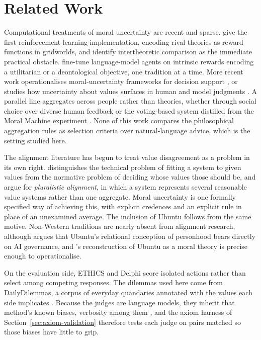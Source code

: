 \documentclass[10pt,twocolumn,a4paper]{article}
\begin{document}
\section{Related Work}
\label{sec:related}


Computational treatments of moral uncertainty are recent and sparse.
\citet{ecoffet2021} give the first reinforcement-learning
implementation, encoding rival theories as reward functions in
gridworlds, and identify intertheoretic comparison as the immediate
practical obstacle. \citet{tennant2024} fine-tune language-model agents
on intrinsic rewards encoding a utilitarian or a deontological
objective, one tradition at a time. More recent work operationalises
moral-uncertainty frameworks for decision support \cite{rosello2025},
or studies how uncertainty about values surfaces in human and model
judgments \cite{kwon2025}. A parallel line aggregates across people
rather than theories, whether through social choice over diverse human
feedback \cite{conitzer2024} or the voting-based system distilled from
the Moral Machine experiment \cite{awad2018,noothigattu2018}. None of
this work compares the philosophical aggregation rules as selection
criteria over natural-language advice, which is the setting studied
here.

The alignment literature has begun to treat value disagreement as a
problem in its own right. \citet{gabriel2020} distinguishes the
technical problem of fitting a system to given values from the
normative problem of deciding whose values those should be, and
\citet{sorensen2024} argue for \emph{pluralistic alignment}, in which a
system represents several reasonable value systems rather than one
aggregate. Moral uncertainty is one formally specified way of achieving
this, with explicit credences and an explicit rule in place of an
unexamined average. The inclusion of Ubuntu follows from the same
motive. Non-Western traditions are nearly absent from alignment
research, although \citet{mhlambi2020} argues that Ubuntu's relational
conception of personhood bears directly on AI governance, and
\citeauthor{metz2007}'s reconstruction of Ubuntu as a moral theory
\cite{metz2007} is precise enough to operationalise.

On the evaluation side, ETHICS \cite{hendrycks2020} and Delphi
\cite{jiang2021} score isolated actions rather than select among
competing responses. The dilemmas used here come from DailyDilemmas, a
corpus of everyday quandaries annotated with the values each side
implicates \cite{dailydilemmas2024}. Because the judges are language
models, they inherit that method's known biases, verbosity among them
\cite{zheng2023}, and the axiom harness of
Section~\ref{sec:axiom-validation} therefore tests each judge on pairs
matched so those biases have little to grip.
\end{document}
